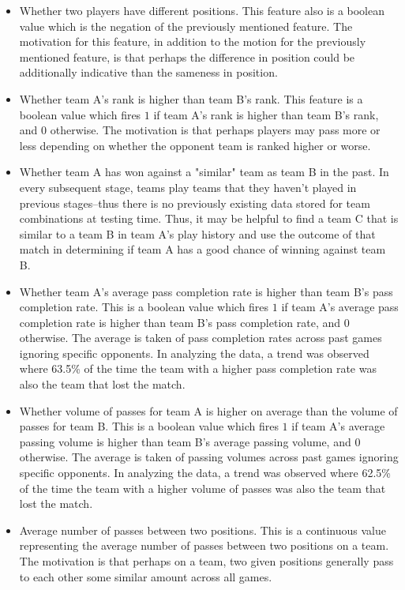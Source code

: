 \documentclass[11pt,letterpaper]{article}
\begin{document}
\begin{itemize}
\item Whether two players have different positions. This feature also is a boolean value which is the negation of the previously mentioned feature. The motivation for this feature, in addition to the motion for the previously mentioned feature, is that perhaps the difference in position could be additionally indicative than the sameness in position.
\item Whether team A's rank is higher than team B's rank. This feature is a boolean value which fires $1$ if team A's rank is higher than team B's rank, and $0$ otherwise. The motivation is that perhaps players may pass more or less depending on whether the opponent team is ranked higher or worse. 
\item Whether team A has won against a "similar" team as team B in the past. In every subsequent stage, teams play teams that they haven't played in previous stages--thus there is no previously existing data stored for team combinations at testing time. Thus, it may be helpful to find a team C that is similar to a team B in team A's play history and use the outcome of that match in determining if team A has a good chance of winning against team B.
\item Whether team A's average pass completion rate is higher than team B's pass completion rate. This is a boolean value which fires $1$ if team A's average pass completion rate is higher than team B's pass completion rate, and $0$ otherwise. The average is taken of pass completion rates across past games ignoring specific opponents. In analyzing the data, a trend was observed where 63.5\% of the time the team with a higher pass completion rate was also the team that lost the match. 
\item Whether volume of passes for team A is higher on average than the volume of passes for team B. This is a boolean value which fires $1$ if team A's average passing volume  is higher than team B's average passing volume, and $0$ otherwise. The average is taken of passing volumes across past games ignoring specific opponents. In analyzing the data, a trend was observed where 62.5\% of the time the team with a higher volume of passes was also the team that lost the match.
\item Average number of passes between two positions. This is a continuous value representing the average number of passes between two positions on a team. The motivation is that perhaps on a team, two given positions generally pass to each other some similar amount across all games.
\end{itemize}
\end{document}
